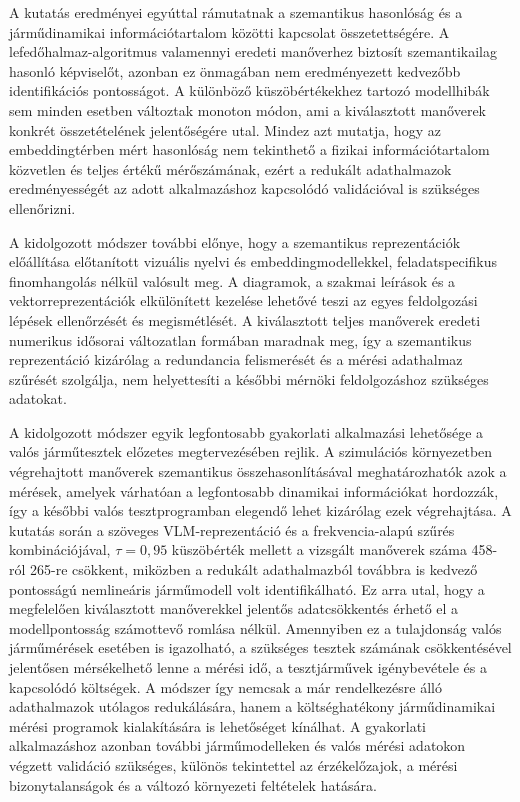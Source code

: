 \documentclass[12pt,a4paper,onehalfspacing, oneside]{book} %
\begin{document}
A kutatás eredményei egyúttal rámutatnak a szemantikus hasonlóság és a járműdinamikai információtartalom közötti kapcsolat összetettségére. A lefedőhalmaz-algoritmus valamennyi eredeti manőverhez biztosít szemantikailag hasonló képviselőt, azonban ez önmagában nem eredményezett kedvezőbb identifikációs pontosságot. A különböző küszöbértékekhez tartozó modellhibák sem minden esetben változtak monoton módon, ami a kiválasztott manőverek konkrét összetételének jelentőségére utal. Mindez azt mutatja, hogy az embeddingtérben mért hasonlóság nem tekinthető a fizikai információtartalom közvetlen és teljes értékű mérőszámának, ezért a redukált adathalmazok eredményességét az adott alkalmazáshoz kapcsolódó validációval is szükséges ellenőrizni.

A kidolgozott módszer további előnye, hogy a szemantikus reprezentációk előállítása előtanított vizuális nyelvi és embeddingmodellekkel, feladatspecifikus finomhangolás nélkül valósult meg. A diagramok, a szakmai leírások és a vektorreprezentációk elkülönített kezelése lehetővé teszi az egyes feldolgozási lépések ellenőrzését és megismétlését. A kiválasztott teljes manőverek eredeti numerikus idősorai változatlan formában maradnak meg, így a szemantikus reprezentáció kizárólag a redundancia felismerését és a mérési adathalmaz szűrését szolgálja, nem helyettesíti a későbbi mérnöki feldolgozáshoz szükséges adatokat.

A kidolgozott módszer egyik legfontosabb gyakorlati alkalmazási lehetősége a valós járműtesztek előzetes megtervezésében rejlik. A szimulációs környezetben végrehajtott manőverek szemantikus összehasonlításával meghatározhatók azok a mérések, amelyek várhatóan a legfontosabb dinamikai információkat hordozzák, így a későbbi valós tesztprogramban elegendő lehet kizárólag ezek végrehajtása. A kutatás során a szöveges VLM-reprezentáció és a frekvencia-alapú szűrés kombinációjával, $\tau=0{,}95$ küszöbérték mellett a vizsgált manőverek száma 458-ról 265-re csökkent, miközben a redukált adathalmazból továbbra is kedvező pontosságú nemlineáris járműmodell volt identifikálható. Ez arra utal, hogy a megfelelően kiválasztott manőverekkel jelentős adatcsökkentés érhető el a modellpontosság számottevő romlása nélkül. Amennyiben ez a tulajdonság valós járműmérések esetében is igazolható, a szükséges tesztek számának csökkentésével jelentősen mérsékelhető lenne a mérési idő, a tesztjárművek igénybevétele és a kapcsolódó költségek. A módszer így nemcsak a már rendelkezésre álló adathalmazok utólagos redukálására, hanem a költséghatékony járműdinamikai mérési programok kialakítására is lehetőséget kínálhat. A gyakorlati alkalmazáshoz azonban további járműmodelleken és valós mérési adatokon végzett validáció szükséges, különös tekintettel az érzékelőzajok, a mérési bizonytalanságok és a változó környezeti feltételek hatására.


\listoffigures
\listoftables
\printglossary[type=\acronymtype, title=Rövidítések]


\end{document}
